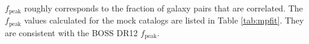                                                                                                                                                                                                                                                                       $f_\mathrm{peak}$ roughly corresponds to the fraction of galaxy pairs that are 
                                                                                                                                                                                                                                                                      correlated. The $f_{\mathrm{peak}}$ values calculated for the mock catalogs are
                                                                                                                                                                                                                                                                      listed in Table \ref{tab:mpfit}. They are consistent with the BOSS DR12 $f_\mathrm{peak}$. 

